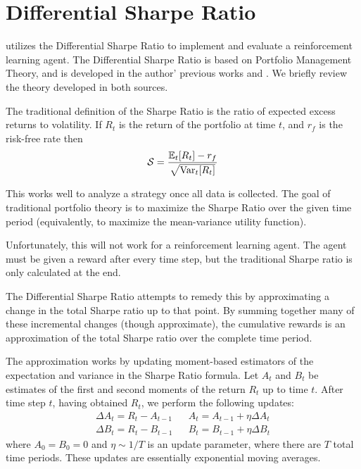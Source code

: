 \section{Differential Sharpe Ratio}
\label{diff_sharpe_ratio_section}

\cite{drl_mvo} utilizes the Differential Sharpe Ratio to implement and evaluate a reinforcement learning agent.
The Differential Sharpe Ratio is based on Portfolio Management Theory, and is developed in the author' previous works \cite{diff_sharpe_ratio_paper} and \cite{diff_sharpe_ratio_book}.
We briefly review the theory developed in both sources.

The traditional definition of the Sharpe Ratio is the ratio of expected excess returns to volatility.
If $R_t$ is the return of the portfolio at time $t$, and $r_f$ is the risk-free rate then
\begin{align*}
  \mathcal{S} = \frac{\mathbb{E}_t[R_t] - r_f}{\sqrt{\operatorname{Var}_t[R_t]}}
\end{align*}

This works well to analyze a strategy once all data is collected.
The goal of traditional portfolio theory is to maximize the Sharpe Ratio over the given time period (equivalently,
to maximize the mean-variance utility function).

Unfortunately, this will not work for a reinforcement learning agent. The agent must be given a reward after every time step,
but the traditional Sharpe ratio is only calculated at the end.

The Differential Sharpe Ratio attempts to remedy this by approximating a change in the total Sharpe ratio up to that point.
By summing together many of these incremental changes (though approximate), the cumulative rewards is an approximation of the total
Sharpe ratio over the complete time period.

The approximation works by updating moment-based estimators of the expectation and variance in the Sharpe Ratio formula.
Let $A_t$ and $B_t$ be estimates of the first and second moments of the return $R_t$ up to time $t$.
After time step $t$, having obtained $R_t$, we perform the following updates:
\begin{align*}
  \Delta A_t = R_t - A_{t-1} && A_t = A_{t-1} + \eta \Delta A_t \\
  \Delta B_t = R_t - B_{t-1} && B_t = B_{t-1} + \eta \Delta B_t
\end{align*}
where $A_0 = B_0 = 0$ and $\eta \sim 1/T$ is an update parameter, where there are $T$ total time periods.
These updates are essentially exponential moving averages.

